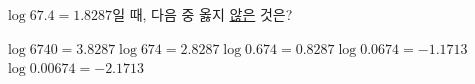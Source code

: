 $\log 67.4=1.8287$일 때, 다음 중 옳지 \underline{않은} 것은?
\begin{choicesii}{$\log 6740=3.8287$}{$\log 674=2.8287$}{$\log 0.674=0.8287$}{$\log 0.0674=-1.1713$}{$\log 0.00674=-2.1713$}\end{choicesii}

